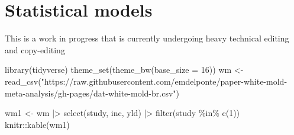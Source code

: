 \documentclass[
  letterpaper,
]{book}
\newenvironment{Shaded}{\begin{snugshade}}{\end{snugshade}}
\newcommand{\AttributeTok}[1]{\textcolor[rgb]{0.40,0.45,0.13}{#1}}
\newcommand{\DecValTok}[1]{\textcolor[rgb]{0.68,0.00,0.00}{#1}}
\newcommand{\FunctionTok}[1]{\textcolor[rgb]{0.28,0.35,0.67}{#1}}
\newcommand{\NormalTok}[1]{\textcolor[rgb]{0.00,0.23,0.31}{#1}}
\newcommand{\OtherTok}[1]{\textcolor[rgb]{0.00,0.23,0.31}{#1}}
\newcommand{\SpecialCharTok}[1]{\textcolor[rgb]{0.37,0.37,0.37}{#1}}
\newcommand{\StringTok}[1]{\textcolor[rgb]{0.13,0.47,0.30}{#1}}
\begin{document}
\hypertarget{statistical-models}{%
\chapter{Statistical models}\label{statistical-models}}

\begin{tcolorbox}[enhanced jigsaw, bottomrule=.15mm, toprule=.15mm, breakable, arc=.35mm, rightrule=.15mm, leftrule=.75mm, colback=white, left=2mm, colframe=quarto-callout-note-color-frame, opacityback=0]
\begin{minipage}[t]{5.5mm}
\textcolor{quarto-callout-note-color}{\faInfo}
\end{minipage}%
\begin{minipage}[t]{\textwidth - 5.5mm}

This is a work in progress that is currently undergoing heavy technical
editing and copy-editing

\end{minipage}%
\end{tcolorbox}

\begin{Shaded}
\begin{Highlighting}[]
\FunctionTok{library}\NormalTok{(tidyverse)}
\FunctionTok{theme\_set}\NormalTok{(}\FunctionTok{theme\_bw}\NormalTok{(}\AttributeTok{base\_size =} \DecValTok{16}\NormalTok{))}
\NormalTok{wm }\OtherTok{\textless{}{-}} \FunctionTok{read\_csv}\NormalTok{(}\StringTok{"https://raw.githubusercontent.com/emdelponte/paper{-}white{-}mold{-}meta{-}analysis/gh{-}pages/dat{-}white{-}mold{-}br.csv"}\NormalTok{)}
\end{Highlighting}
\end{Shaded}

\begin{Shaded}
\begin{Highlighting}[]
\NormalTok{wm1 }\OtherTok{\textless{}{-}}\NormalTok{ wm }\SpecialCharTok{|\textgreater{}} 
  \FunctionTok{select}\NormalTok{(study, inc, yld) }\SpecialCharTok{|\textgreater{}} 
  \FunctionTok{filter}\NormalTok{(study }\SpecialCharTok{\%in\%} \FunctionTok{c}\NormalTok{(}\DecValTok{1}\NormalTok{)) }
\NormalTok{knitr}\SpecialCharTok{::}\FunctionTok{kable}\NormalTok{(wm1)}
\end{Highlighting}
\end{Shaded}
\end{document}
